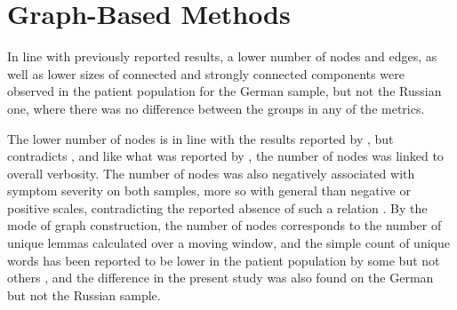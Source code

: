 


\section{Graph-Based Methods}
\label{sec:discussion:grpah}

In line with previously reported results, a lower number of nodes and edges, as well as lower sizes of connected and strongly connected components were observed in the patient population for the German sample, but not the Russian one, where there was no difference between the groups in any of the metrics. 

The lower number of nodes is in line with the results reported by \citet{nikzad2022does}, but contradicts \citet{mota2012speech, mota2014graph}, and like what was reported by \citet{nettekoven2023semantic}, the number of nodes was linked to overall verbosity. The number of nodes was also negatively associated with symptom severity on both samples, more so with general than negative or positive scales, contradicting the reported absence of such a relation \citep{mota2012speech, mota2014graph, nettekoven2023semantic}. By the mode of graph construction, the number of nodes corresponds to the number of unique lemmas calculated over a moving window, and the simple count of unique words has been reported to be lower in the patient population by some \citep{willits2018evidence} but not others \citep{schneider2023syntactic}, and the difference in the present study was also found on the German but not the Russian sample. 

